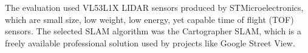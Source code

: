 \documentclass[conference]{IEEEtran}
\begin{document}
The evaluation used VL53L1X LIDAR sensors produced by STMicroelectronics, which are small size, low weight, low energy, yet capable time of flight (TOF) sensors. The selected SLAM algorithm was the Cartographer SLAM, which is a freely available  professional solution used by projects like Google Street View. 

%
%



%
%
\end{document}
